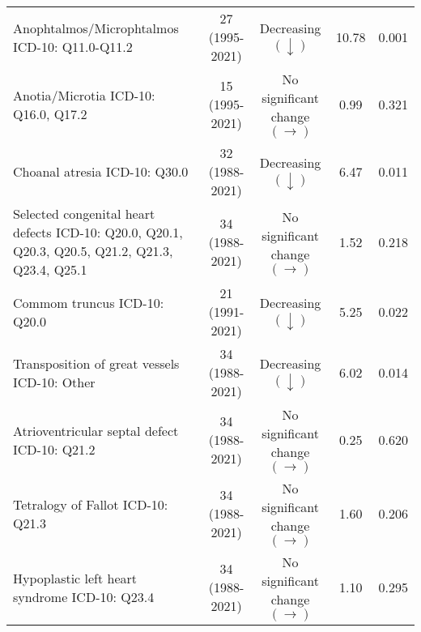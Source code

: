 \documentclass[
]{krantz}
\begin{document}
\begin{longtable}[t]{>{\raggedright\arraybackslash}p{4cm}cccc}
Anophtalmos/Microphtalmos\newline  \tiny{ ICD-10: Q11.0-Q11.2} & \makecell[c]{27\\ \tiny{(1995-2021)}} & Decreasing $\left(\downarrow \right)$ & 10.78 & 0.001\\
\addlinespace
Anotia/Microtia\newline  \tiny{ ICD-10: Q16.0, Q17.2} & \makecell[c]{15\\ \tiny{(1995-2021)}} & \makecell[c]{No significant \\ change $\left(\rightarrow \right)$} & 0.99 & 0.321\\
Choanal atresia\newline  \tiny{ ICD-10: Q30.0} & \makecell[c]{32\\ \tiny{(1988-2021)}} & Decreasing $\left(\downarrow \right)$ & 6.47 & 0.011\\
Selected congenital heart defects\newline  \tiny{ ICD-10: Q20.0, Q20.1, Q20.3, Q20.5, Q21.2, Q21.3, Q23.4, Q25.1} & \makecell[c]{34\\ \tiny{(1988-2021)}} & \makecell[c]{No significant \\ change $\left(\rightarrow \right)$} & 1.52 & 0.218\\
Commom truncus\newline  \tiny{ ICD-10: Q20.0} & \makecell[c]{21\\ \tiny{(1991-2021)}} & Decreasing $\left(\downarrow \right)$ & 5.25 & 0.022\\
Transposition of great vessels\newline  \tiny{ ICD-10: Other} & \makecell[c]{34\\ \tiny{(1988-2021)}} & Decreasing $\left(\downarrow \right)$ & 6.02 & 0.014\\
\addlinespace
Atrioventricular septal defect\newline  \tiny{ ICD-10: Q21.2} & \makecell[c]{34\\ \tiny{(1988-2021)}} & \makecell[c]{No significant \\ change $\left(\rightarrow \right)$} & 0.25 & 0.620\\
Tetralogy of Fallot\newline  \tiny{ ICD-10: Q21.3} & \makecell[c]{34\\ \tiny{(1988-2021)}} & \makecell[c]{No significant \\ change $\left(\rightarrow \right)$} & 1.60 & 0.206\\
Hypoplastic left heart syndrome\newline  \tiny{ ICD-10: Q23.4} & \makecell[c]{34\\ \tiny{(1988-2021)}} & \makecell[c]{No significant \\ change $\left(\rightarrow \right)$} & 1.10 & 0.295\\

\end{longtable}
\end{document}

